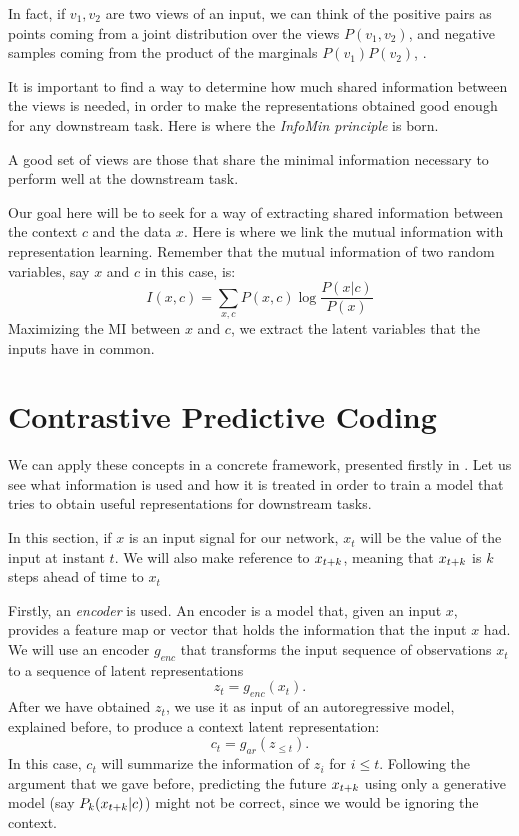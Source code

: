 In fact, if $v_1,v_2$ are two views of an input, we can think of the positive pairs as points coming from a joint distribution over the views $P(v_1,v_2)$, and negative samples coming from the product of the marginals $P(v_1)P(v_2)$, \citep{tian_what_2020}.

It is important to find a way to determine how much shared information between the views is needed, in order to make the representations obtained good enough for any downstream task. Here is where the \emph{InfoMin principle} is born. 

\begin{ndefC}\label{def:infomin}
    A good set of views are those that share the minimal information necessary to perform well at the downstream task.
\end{ndefC} 


Our goal here will be to seek for a way of extracting shared information between the context $c$ and the data $x$. Here is where we link the mutual information with representation learning. Remember that the mutual information of two random variables, say $x$ and $c$ in this case, is:
\begin{equation}\label{EQ:MI}
I(x,c) = \sum_{x,c}P(x,c)\log\frac{P(x|c)}{P(x)}
\end{equation}
Maximizing the MI between $x$ and $c$, we extract the latent variables that the inputs have in common. 

\section{Contrastive Predictive Coding}

We can apply these concepts in a concrete framework, presented firstly in \cite{oord_representation_2019}. Let us see what information is used and how it is treated in order to train a model that tries to obtain useful representations for downstream tasks.

In this section, if $x$ is an input signal for our network, $x_t$ will be the value of the input at instant $t$. We will also make reference to $x_{t+k}$, meaning that $x_{t+k}$ is $k$ steps ahead of time to $x_t$

Firstly, an \emph{encoder} is used. An encoder is a model that, given an input $x$, provides a feature map or vector that holds the information that the input $x$ had. We will use an encoder $g_{enc}$ that transforms the input sequence of observations $x_t$ to a sequence of latent representations
$$
z_t = g_{enc}(x_t).
$$
After we have obtained $z_t$, we use it as input of an autoregressive model, explained before, to produce a context latent representation:
$$
c_t = g_{ar}(z_{\leq t}).
$$
In this case, $c_t$ will summarize the information of $z_i$ for $i \leq t$. Following the argument that we gave before, predicting the future $x_{t+k}$ using only a generative model (say $P_k(x_{t+k}|c)$)
might not be correct, since we would be ignoring the context. \\

